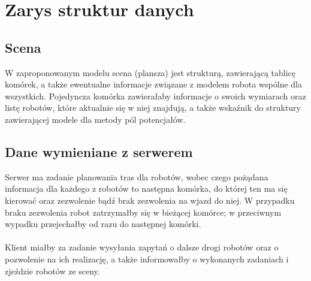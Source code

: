 
\section{Zarys struktur danych}
\subsection{Scena}
W zaproponowanym modelu scena (plansza) jest strukturą, zawierającą tablicę komórek, a także ewentualne informacje związane z modelem robota wspólne dla wszystkich. Pojedyncza komórka zawierałaby informacje o swoich wymiarach oraz listę robotów, które aktualnie się w niej znajdują, a także wskaźnik do struktury zawierającej modele dla metody pól potencjałów.
\subsection{Dane wymieniane z serwerem}
Serwer ma zadanie planowania tras dla robotów, wobec czego pożądana informacja dla każdego z robotów to następna komórka, do której ten ma się kierować oraz zezwolenie bądź brak zezwolenia na wjazd do niej. W przypadku braku zezwolenia robot zatrzymałby się w bieżącej komórce; w przeciwnym wypadku przejechałby od razu do następnej komórki.\\\\Klient miałby za zadanie wysyłania zapytań o dalsze drogi robotów oraz o pozwolenie na ich realizację, a także informowałby o wykonanych zadaniach i zjeździe robotów ze sceny.
